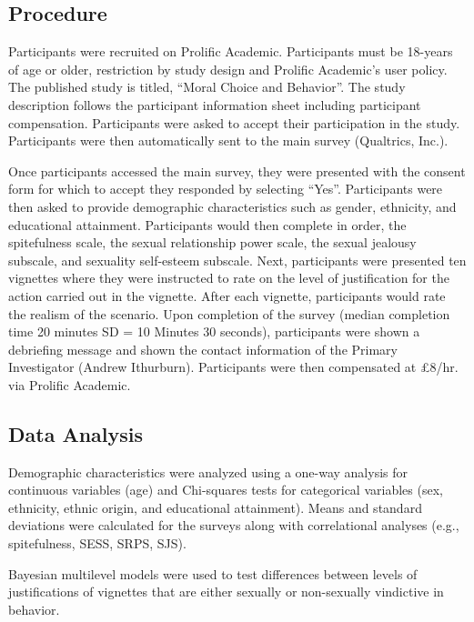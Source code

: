\documentclass[
]{article}
\begin{document}
\hypertarget{procedure}{%
\subsection{Procedure}\label{procedure}}

Participants were recruited on Prolific Academic. Participants must be
18-years of age or older, restriction by study design and Prolific
Academic's user policy. The published study is titled, ``Moral Choice
and Behavior''. The study description follows the participant
information sheet including participant compensation. Participants were
asked to accept their participation in the study. Participants were then
automatically sent to the main survey (Qualtrics, Inc.).

Once participants accessed the main survey, they were presented with the
consent form for which to accept they responded by selecting ``Yes''.
Participants were then asked to provide demographic characteristics such
as gender, ethnicity, and educational attainment. Participants would
then complete in order, the spitefulness scale, the sexual relationship
power scale, the sexual jealousy subscale, and sexuality self-esteem
subscale. Next, participants were presented ten vignettes where they
were instructed to rate on the level of justification for the action
carried out in the vignette. After each vignette, participants would
rate the realism of the scenario. Upon completion of the survey (median
completion time 20 minutes SD = 10 Minutes 30 seconds), participants
were shown a debriefing message and shown the contact information of the
Primary Investigator (Andrew Ithurburn). Participants were then
compensated at £8/hr. via Prolific Academic.

\hypertarget{data-analysis}{%
\subsection{Data Analysis}\label{data-analysis}}

Demographic characteristics were analyzed using a one-way analysis for
continuous variables (age) and Chi-squares tests for categorical
variables (sex, ethnicity, ethnic origin, and educational attainment).
Means and standard deviations were calculated for the surveys along with
correlational analyses (e.g., spitefulness, SESS, SRPS, SJS).

Bayesian multilevel models were used to test differences between levels
of justifications of vignettes that are either sexually or non-sexually
vindictive in behavior.
\end{document}
